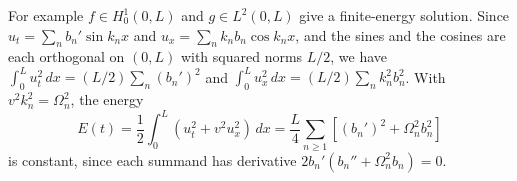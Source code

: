 For example $f\in H_0^1(0,L)$ and $g\in L^2(0,L)$ give a finite-energy
solution. Since $u_t=\sum_nb_n'\sin k_nx$ and
$u_x=\sum_nk_nb_n\cos k_nx$, and the sines and the cosines are each
orthogonal on $(0,L)$ with squared norms $L/2$, we have
$\int_0^Lu_t^2\,dx=(L/2)\sum_n(b_n')^2$ and
$\int_0^Lu_x^2\,dx=(L/2)\sum_nk_n^2b_n^2$. With $v^2k_n^2=\Omega_n^2$,
the energy
\[
E(t)=\frac12\int_0^L(u_t^2+v^2u_x^2)\,dx
=\frac L4\sum_{n\ge1}[(b_n')^2+\Omega_n^2b_n^2]
\]
is constant, since each summand has derivative
$2b_n'(b_n''+\Omega_n^2b_n)=0$.

